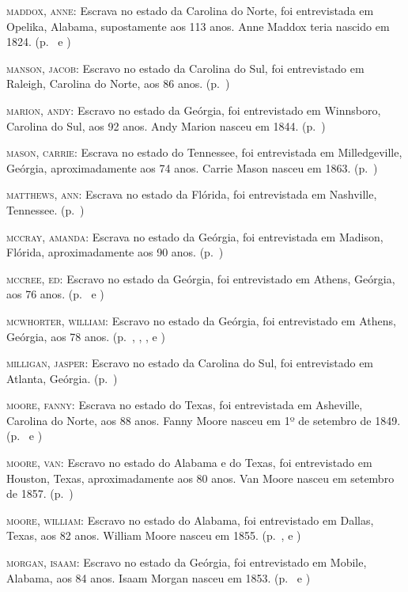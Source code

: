\begin{Parskip}
\textsc{maddox, anne:} Escrava no estado da Carolina do Norte, foi
entrevistada em Opelika, Alabama, supostamente aos 113 anos. Anne Maddox
teria nascido em 1824. (p.~\pageref{ref179} e \pageref{ref180})

\textsc{manson, jacob:} Escravo no estado da Carolina do Sul, foi
entrevistado em Raleigh, Carolina do Norte, aos 86 anos. (p.~\pageref{ref181})

\textsc{marion, andy:} Escravo no estado da Geórgia, foi entrevistado em
Winnsboro, Carolina do Sul, aos 92 anos. Andy Marion nasceu em 1844. (p.~\pageref{ref182})

\textsc{mason, carrie:} Escrava no estado do Tennessee, foi entrevistada
em Milledgeville, Geórgia, aproximadamente aos 74 anos. Carrie Mason
nasceu em 1863. (p.~\pageref{ref183})

\textsc{matthews, ann:} Escrava no estado da Flórida, foi entrevistada
em Nashville, Tennessee. (p.~\pageref{ref184})

\textsc{mccray, amanda:} Escrava no estado da Geórgia, foi entrevistada
em Madison, Flórida, aproximadamente aos 90 anos. (p.~\pageref{ref185})

\textsc{mccree, ed:} Escravo no estado da Geórgia, foi entrevistado em
Athens, Geórgia, aos 76 anos. (p.~\pageref{ref186} e \pageref{ref187})

\textsc{mcwhorter, william:} Escravo no estado da Geórgia, foi
entrevistado em Athens, Geórgia, aos 78 anos. (p.~\pageref{ref188}, \pageref{ref189}, \pageref{ref190}, \pageref{ref191} e \pageref{ref192})

\textsc{milligan, jasper:} Escravo no estado da Carolina do Sul, foi
entrevistado em Atlanta, Geórgia. (p.~\pageref{ref193})

\textsc{moore, fanny:} Escrava no estado do Texas, foi entrevistada em
Asheville, Carolina do Norte, aos 88 anos. Fanny Moore nasceu em 1º de
setembro de 1849. (p.~\pageref{ref194} e \pageref{ref195})

\textsc{moore, van:} Escravo no estado do Alabama e do Texas, foi
entrevistado em Houston, Texas, aproximadamente aos 80 anos. Van Moore
nasceu em setembro de 1857. (p.~\pageref{ref196})

\textsc{moore, william:} Escravo no estado do Alabama, foi entrevistado
em Dallas, Texas, aos 82 anos. William Moore nasceu em 1855. (p.~\pageref{ref197}, \pageref{ref198} e \pageref{ref199})

\textsc{morgan, isaam:} Escravo no estado da Geórgia, foi entrevistado
em Mobile, Alabama, aos 84 anos. Isaam Morgan nasceu em 1853. (p.~\pageref{ref200} e \pageref{ref201})


\end{Parskip}
